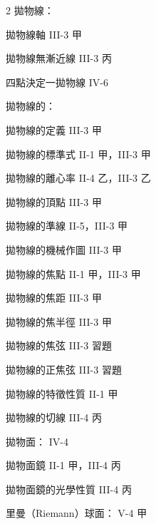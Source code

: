 \begin{multicols}{2}
\noindent 拋物線：\par
\noindent\hspace*{1.5em} 拋物線軸 \hfill III-3 甲\par
\noindent\hspace*{1.5em} 拋物線無漸近線 \hfill III-3 丙\par
\noindent\hspace*{1.5em} 四點決定一拋物線 \hfill IV-6\par
\noindent 拋物線的：\par
\noindent\hspace*{1.5em} 拋物線的定義 \hfill III-3 甲\par
\noindent\hspace*{1.5em} 拋物線的標準式 \hfill II-1 甲，III-3 甲\par
\noindent\hspace*{1.5em} 拋物線的離心率 \hfill II-4 乙，III-3 乙\par
\noindent\hspace*{1.5em} 拋物線的頂點 \hfill III-3 甲\par
\noindent\hspace*{1.5em} 拋物線的準線 \hfill II-5，III-3 甲\par
\noindent\hspace*{1.5em} 拋物線的機械作圖 \hfill III-3 甲\par
\noindent\hspace*{1.5em} 拋物線的焦點 \hfill II-1 甲，III-3 甲\par
\noindent\hspace*{1.5em} 拋物線的焦距 \hfill III-3 甲\par
\noindent\hspace*{1.5em} 拋物線的焦半徑 \hfill III-3 甲\par
\noindent\hspace*{1.5em} 拋物線的焦弦 \hfill III-3 習題\par
\noindent\hspace*{1.5em} 拋物線的正焦弦 \hfill III-3 習題\par
\noindent\hspace*{1.5em} 拋物線的特徵性質 \hfill II-1 甲\par
\noindent\hspace*{1.5em} 拋物線的切線 \hfill III-4 丙\par
\noindent 拋物面： \hfill IV-4\par
\noindent\hspace*{1.5em} 拋物面鏡 \hfill II-1 甲，III-4 丙\par
\noindent\hspace*{1.5em} 拋物面鏡的光學性質 \hfill III-4 丙\par
\noindent 里曼（Riemann）球面： \hfill V-4 甲\par


\end{multicols}

